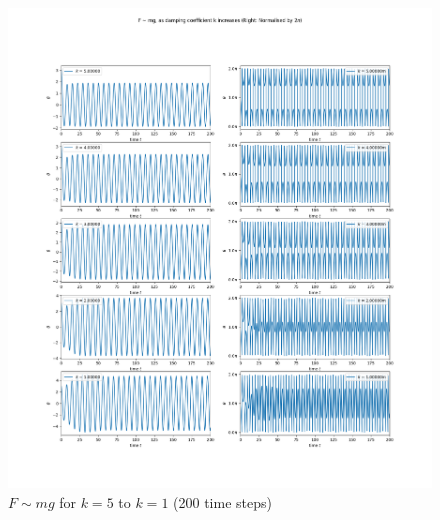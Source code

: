 \documentclass[10pt, twocolumn]{article}
\begin{document}
\begin{figure}
    \centering
    \includegraphics[width = \columnwidth]{Projects/ForcedSimplePendulum/Plots/F~mg as damping coefficient k increases from 5 to 1 (med).png}
    \caption{$F \sim{mg}$ for $k = 5$ to $k = 1$ (200 time steps)}
    \label{k 5 to 1 med}
\end{figure}
\end{document}
